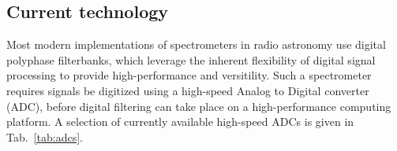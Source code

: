 \documentclass{ws-rv961x669}
\begin{document}






\subsection{Current technology}

Most modern implementations of spectrometers in radio astronomy use digital polyphase filterbanks, which leverage the inherent flexibility of digital signal processing to provide high-performance and versitility. Such a spectrometer requires signals be digitized using a high-speed Analog to Digital converter (ADC), before digital filtering can take place on a high-performance computing platform.
A selection of currently available high-speed ADCs is given in Tab.~\ref{tab:adcs}.
\end{document}
